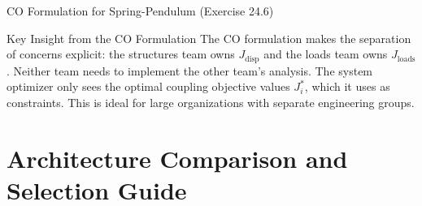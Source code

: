 \documentclass[aspectratio=169,10pt]{beamer}
\begin{document}
\begin{frame}[allowframebreaks]{CO Formulation for Spring-Pendulum (Exercise 24.6)}
  \begin{alertblock}{Key Insight from the CO Formulation}
    The CO formulation makes the separation of concerns explicit: the
    structures team owns $J_{\mathrm{disp}}$ and the loads team owns
    $J_{\mathrm{loads}}$.  Neither team needs to implement the other
    team's analysis.  The system optimizer only sees the optimal coupling
    objective values $J^*_i$, which it uses as constraints.  This is ideal
    for large organizations with separate engineering groups.
  \end{alertblock}

\end{frame}

\section{Architecture Comparison and Selection Guide}
\end{document}
